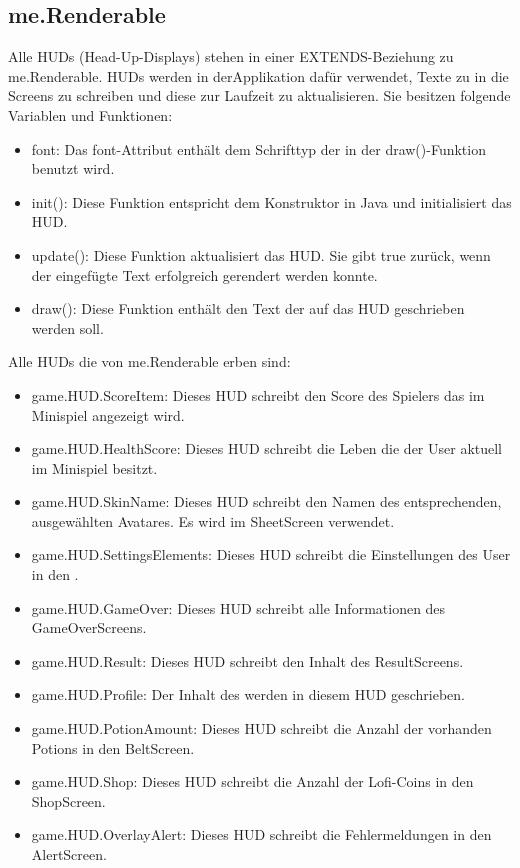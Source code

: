 


          
\subsection{me.Renderable}
\label{Render}                   
Alle HUDs (Head-Up-Displays) stehen in einer EXTENDS-Beziehung zu me.Renderable. HUDs werden in derApplikation daf\"ur verwendet, Texte zu 
in die Screens zu schreiben und diese zur Laufzeit zu aktualisieren.
Sie besitzen folgende Variablen und Funktionen:
\begin{itemize} 
	\item font: Das font-Attribut enth\"alt dem Schrifttyp der in der draw()-Funktion benutzt wird.
	\item init(): Diese Funktion entspricht dem Konstruktor in Java und initialisiert das HUD.
	\item update(): Diese Funktion aktualisiert das HUD. Sie gibt true zur\"uck, wenn der eingef\"ugte Text erfolgreich gerendert werden konnte.
	\item draw(): Diese Funktion enth\"alt den Text der auf das HUD geschrieben werden soll.
\end{itemize}                     

Alle HUDs die von me.Renderable erben sind:
\begin{itemize} 
	\item game.HUD.ScoreItem: Dieses HUD schreibt den Score des Spielers das im Minispiel angezeigt wird.
	\item game.HUD.HealthScore: Dieses HUD schreibt die Leben die der User aktuell im Minispiel besitzt.
	\item game.HUD.SkinName: Dieses HUD schreibt den Namen des entsprechenden, ausgew\"ahlten Avatares. Es wird im SheetScreen verwendet.
	\item game.HUD.SettingsElements: Dieses HUD schreibt die Einstellungen des User in den .
	\item game.HUD.GameOver: Dieses HUD schreibt alle Informationen des GameOverScreens.
	\item game.HUD.Result: Dieses HUD schreibt den Inhalt des ResultScreens.
	\item game.HUD.Profile: Der Inhalt des  werden in diesem HUD geschrieben.
	\item game.HUD.PotionAmount: Dieses HUD schreibt die Anzahl der vorhanden Potions in den BeltScreen.
	\item game.HUD.Shop: Dieses HUD schreibt die Anzahl der Lofi-Coins in den ShopScreen.
	\item game.HUD.OverlayAlert: Dieses HUD schreibt die Fehlermeldungen in den AlertScreen.
\end{itemize} 


